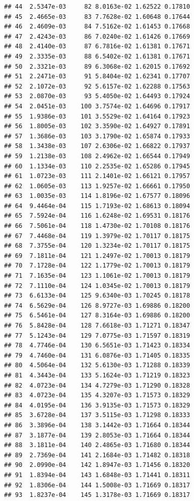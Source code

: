 \documentclass[
]{book}
\begin{document}
\begin{verbatim}
## 44  2.5347e-03     82 8.0163e-02 1.62522 0.17810
## 45  2.4665e-03     83 7.7628e-02 1.60648 0.17644
## 46  2.4609e-03     84 7.5162e-02 1.61453 0.17668
## 47  2.4243e-03     86 7.0240e-02 1.61426 0.17669
## 48  2.4140e-03     87 6.7816e-02 1.61381 0.17671
## 49  2.3335e-03     88 6.5402e-02 1.61381 0.17671
## 50  2.3321e-03     89 6.3068e-02 1.62015 0.17692
## 51  2.2471e-03     91 5.8404e-02 1.62341 0.17707
## 52  2.1072e-03     92 5.6157e-02 1.62288 0.17563
## 53  2.0870e-03     93 5.4050e-02 1.64493 0.17924
## 54  2.0451e-03    100 3.7574e-02 1.64696 0.17917
## 55  1.9386e-03    101 3.5529e-02 1.64164 0.17923
## 56  1.8005e-03    102 3.3590e-02 1.64927 0.17891
## 57  1.3686e-03    103 3.1790e-02 1.65874 0.17933
## 58  1.3438e-03    107 2.6306e-02 1.66822 0.17937
## 59  1.2138e-03    108 2.4962e-02 1.66544 0.17949
## 60  1.1334e-03    110 2.2535e-02 1.65286 0.17945
## 61  1.0723e-03    111 2.1401e-02 1.66121 0.17957
## 62  1.0605e-03    113 1.9257e-02 1.66661 0.17950
## 63  1.0035e-03    114 1.8196e-02 1.67577 0.18096
## 64  9.4464e-04    115 1.7193e-02 1.68613 0.18094
## 65  7.5924e-04    116 1.6248e-02 1.69531 0.18176
## 66  7.5061e-04    118 1.4730e-02 1.70108 0.18176
## 67  7.4468e-04    119 1.3979e-02 1.70117 0.18175
## 68  7.3755e-04    120 1.3234e-02 1.70117 0.18175
## 69  7.1811e-04    121 1.2497e-02 1.70013 0.18179
## 70  7.1728e-04    122 1.1779e-02 1.70013 0.18179
## 71  7.1635e-04    123 1.1061e-02 1.70013 0.18179
## 72  7.1110e-04    124 1.0345e-02 1.70013 0.18179
## 73  6.6133e-04    125 9.6340e-03 1.70245 0.18178
## 74  6.5629e-04    126 8.9727e-03 1.69886 0.18200
## 75  6.5461e-04    127 8.3164e-03 1.69886 0.18200
## 76  5.8428e-04    128 7.6618e-03 1.71271 0.18347
## 77  5.1243e-04    129 7.0775e-03 1.71597 0.18319
## 78  4.7746e-04    130 6.5651e-03 1.71423 0.18334
## 79  4.7460e-04    131 6.0876e-03 1.71405 0.18335
## 80  4.5064e-04    132 5.6130e-03 1.71288 0.18339
## 81  4.3443e-04    133 5.1624e-03 1.71219 0.18323
## 82  4.0723e-04    134 4.7279e-03 1.71290 0.18328
## 83  4.0723e-04    135 4.3207e-03 1.71573 0.18329
## 84  4.0195e-04    136 3.9135e-03 1.71573 0.18329
## 85  3.6728e-04    137 3.5115e-03 1.71298 0.18333
## 86  3.3896e-04    138 3.1442e-03 1.71664 0.18344
## 87  3.1877e-04    139 2.8053e-03 1.71664 0.18344
## 88  3.1811e-04    140 2.4865e-03 1.71680 0.18344
## 89  2.7369e-04    141 2.1684e-03 1.71482 0.18318
## 90  2.0990e-04    142 1.8947e-03 1.71456 0.18320
## 91  1.8394e-04    143 1.6848e-03 1.71441 0.18311
## 92  1.8306e-04    144 1.5008e-03 1.71669 0.18317
## 93  1.8237e-04    145 1.3178e-03 1.71669 0.18317

\end{verbatim}
\end{document}
